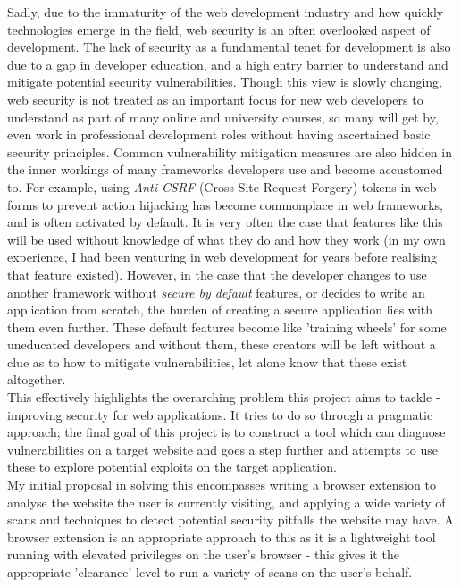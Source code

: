 Sadly, due to the immaturity of the web development industry and how quickly technologies emerge in the field, web security is an often overlooked aspect of development. 
The lack of security as a fundamental tenet for development is also due to a gap in developer education, and a high entry barrier to understand and mitigate potential security vulnerabilities. Though this view is slowly changing, web security is not treated as an important focus for new web developers to understand as part of many online and university courses, so many will get by, even work in professional development roles without having ascertained basic security principles. 
Common vulnerability mitigation measures are also hidden in the inner workings of many frameworks developers use and become accustomed to. 
For example, using \textit{Anti CSRF} (Cross Site Request Forgery) tokens in web forms to prevent action hijacking has become commonplace in web frameworks, and is often activated by default.
It is very often the case that features like this will be used without knowledge of what they do and how they work (in my own experience, I had been venturing in web development for years before realising that feature existed). However, in the case that the developer changes to use another framework without \textit{secure by default} features, or decides to write an application from scratch, the burden of creating a secure application lies with them even further. These default features become like 'training wheels' for some uneducated developers and without them, these creators will be left without a clue as to how to mitigate vulnerabilities, let alone know that these exist altogether. \\


This effectively highlights the overarching problem this project aims to tackle - improving security for web applications. It tries to do so through a pragmatic approach; the final goal of this project is to construct a tool which can diagnose vulnerabilities on a target website and goes a step further and attempts to use these to explore potential exploits on the target application.   \\


My initial proposal in solving this encompasses writing a browser extension to analyse the website the user is currently visiting, and applying a wide variety of scans and techniques to detect potential security pitfalls the website may have.
A browser extension is an appropriate approach to this as it is a lightweight tool running with elevated privileges on the user's browser - this gives it the appropriate 'clearance' level to run a variety of scans on the user's behalf. \\


